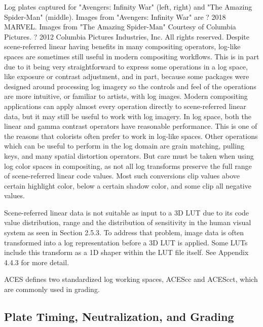 Log plates captured for "Avengers: Infinity War" (left, right) and "The Amazing Spider-Man" (middle).
Images from "Avengers: Infinity War" are ? 2018 MARVEL.  Images from "The Amazing Spider-Man" Courtesy of Columbia Pictures. ? 2012 Columbia Pictures Industries, Inc. All rights reserved.
Despite scene-referred linear having benefits in many compositing operators, log-like spaces are sometimes still useful in modern compositing workflows. This is in part due to it being very straightforward to express some operations in a log space, like exposure or contrast adjustment, and in part, because some packages were designed around processing log imagery so the controls and feel of the operations are more intuitive, or familiar to artists, with log images. Modern compositing applications can apply almost every operation directly to scene-referred linear data, but it may still be useful to work with log imagery. In log space, both the linear and gamma contrast operators have reasonable performance. This is one of the reasons that colorists often prefer to work in log-like spaces. Other operations which can be useful to perform in the log domain are grain matching, pulling keys, and many spatial distortion operators. But care must be taken when using log color spaces in compositing, as not all log transforms preserve the full range of scene-referred linear code values. Most such conversions clip values above certain highlight color, below a certain shadow color, and some clip all negative values.

Scene-referred linear data is not suitable as input to a 3D LUT due to its code value distribution, range and the distribution of sensitivity in the human visual system as seen in Section 2.5.3. To address that problem, image data is often transformed into a log representation before a 3D LUT is applied. Some LUTs include this transform as a 1D shaper within the LUT file itself. See Appendix 4.4.3 for more detail.

ACES defines two standardized log working spaces, ACEScc and ACEScct, which are commonly used in grading.

\subsection{Plate Timing, Neutralization, and Grading}%
\label{subsec:plate-timing-neutralization-and-grading}

